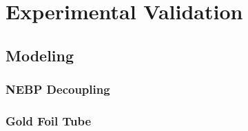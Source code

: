 
\cleardoublepage


\chapter{Experimental Validation}




\section{Modeling}

\subsection{NEBP Decoupling}



\subsection{Gold Foil Tube}


%



